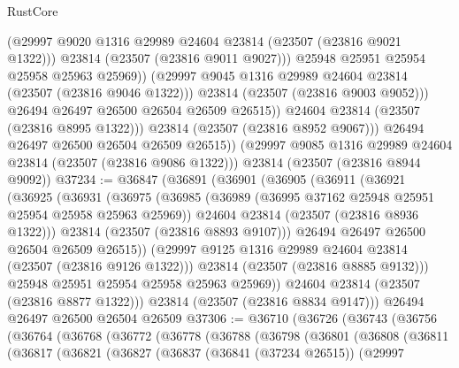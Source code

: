 \begin{lexlean}{RustCore}
\begin{coremodule}
                        (@29997 @9020 @1316 @29989 @24604 @23814 (@23507 (@23816 @9021 @1322)))
                        @23814
                        (@23507 (@23816 @9011 @9027)))
                      @25948
                      @25951
                      @25954
                      @25958
                      @25963
                      @25969))
                  (@29997 @9045 @1316 @29989 @24604 @23814 (@23507 (@23816 @9046 @1322)))
                  @23814
                  (@23507 (@23816 @9003 @9052)))
                @26494
                @26497
                @26500
                @26504
                @26509
                @26515))
            @24604
            @23814
            (@23507 (@23816 @8995 @1322)))
          @23814
          (@23507 (@23816 @8952 @9067)))
        @26494
        @26497
        @26500
        @26504
        @26509
        @26515))
    (@29997 @9085 @1316 @29989 @24604 @23814 (@23507 (@23816 @9086 @1322)))
    @23814
    (@23507 (@23816 @8944 @9092))
@37234 := @36847
    (@36891
      (@36901
        (@36905
          (@36911
            (@36921
              (@36925
                (@36931
                  (@36975
                    (@36985
                      (@36989 (@36995 @37162 @25948 @25951 @25954 @25958 @25963 @25969))
                      @24604
                      @23814
                      (@23507 (@23816 @8936 @1322)))
                    @23814
                    (@23507 (@23816 @8893 @9107)))
                  @26494
                  @26497
                  @26500
                  @26504
                  @26509
                  @26515))
              (@29997 @9125 @1316 @29989 @24604 @23814 (@23507 (@23816 @9126 @1322)))
              @23814
              (@23507 (@23816 @8885 @9132)))
            @25948
            @25951
            @25954
            @25958
            @25963
            @25969))
        @24604
        @23814
        (@23507 (@23816 @8877 @1322)))
      @23814
      (@23507 (@23816 @8834 @9147)))
    @26494
    @26497
    @26500
    @26504
    @26509
@37306 := @36710
    (@36726
      (@36743
        (@36756
          (@36764
            (@36768
              (@36772
                (@36778
                  (@36788
                    (@36798
                      (@36801
                        (@36808
                          (@36811
                            (@36817
                              (@36821
                                (@36827
                                  (@36837
                                    (@36841 (@37234 @26515))
                                    (@29997

\end{coremodule}
\end{lexlean}
